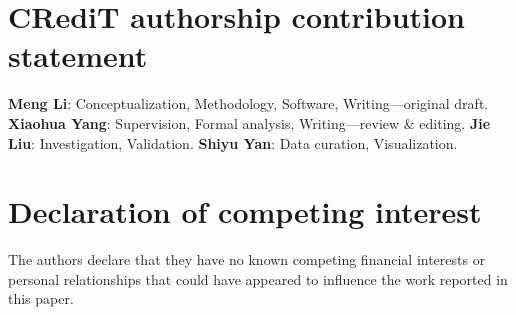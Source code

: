 \documentclass[review,12pt,authoryear]{elsarticle}
\begin{document}
\section*{CRediT authorship contribution statement}

\textbf{Meng Li}: Conceptualization, Methodology, Software, Writing---original draft. \textbf{Xiaohua Yang}: Supervision, Formal analysis, Writing---review \& editing. \textbf{Jie Liu}: Investigation, Validation. \textbf{Shiyu Yan}: Data curation, Visualization.

\section*{Declaration of competing interest}

The authors declare that they have no known competing financial interests or personal relationships that could have appeared to influence the work reported in this paper.
\end{document}
